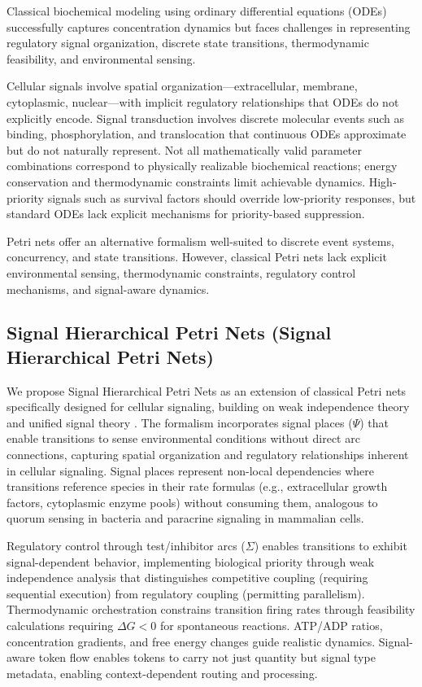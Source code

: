 \documentclass[twocolumn,11pt]{article}
\newcommand{\shpns}{Signal Hierarchical Petri Nets}
\newcommand{\dg}{\Delta G}
\begin{document}
Classical biochemical modeling using ordinary differential equations (ODEs) successfully captures concentration dynamics but faces challenges in representing regulatory signal organization, discrete state transitions, thermodynamic feasibility, and environmental sensing.

Cellular signals involve spatial organization---extracellular, membrane, cytoplasmic, nuclear---with implicit regulatory relationships that ODEs do not explicitly encode. Signal transduction involves discrete molecular events such as binding, phosphorylation, and translocation that continuous ODEs approximate but do not naturally represent. Not all mathematically valid parameter combinations correspond to physically realizable biochemical reactions; energy conservation and thermodynamic constraints limit achievable dynamics. High-priority signals such as survival factors should override low-priority responses, but standard ODEs lack explicit mechanisms for priority-based suppression.

Petri nets offer an alternative formalism well-suited to discrete event systems, concurrency, and state transitions. However, classical Petri nets lack explicit environmental sensing, thermodynamic constraints, regulatory control mechanisms, and signal-aware dynamics.

\subsection{Signal Hierarchical Petri Nets (\shpns{})}

We propose \shpns{} as an extension of classical Petri nets specifically designed for cellular signaling, building on weak independence theory \citep{simao2025weak} and unified signal theory \citep{simao2025unified}. The formalism incorporates signal places ($\Psi$) that enable transitions to sense environmental conditions without direct arc connections, capturing spatial organization and regulatory relationships inherent in cellular signaling. Signal places represent non-local dependencies where transitions reference species in their rate formulas (e.g., extracellular growth factors, cytoplasmic enzyme pools) without consuming them, analogous to quorum sensing in bacteria and paracrine signaling in mammalian cells.

Regulatory control through test/inhibitor arcs ($\Sigma$) enables transitions to exhibit signal-dependent behavior, implementing biological priority through weak independence analysis that distinguishes competitive coupling (requiring sequential execution) from regulatory coupling (permitting parallelism). Thermodynamic orchestration constrains transition firing rates through feasibility calculations requiring $\dg{} < 0$ for spontaneous reactions. ATP/ADP ratios, concentration gradients, and free energy changes guide realistic dynamics. Signal-aware token flow enables tokens to carry not just quantity but signal type metadata, enabling context-dependent routing and processing.
\end{document}
